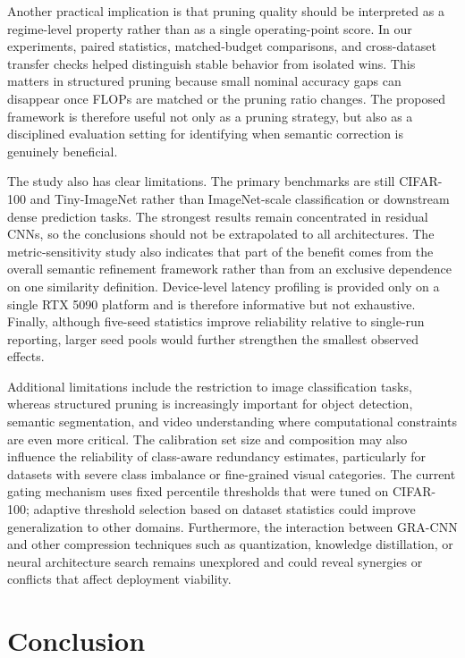 \documentclass[preprint,12pt]{elsarticle}
\begin{document}
Another practical implication is that pruning quality should be interpreted as a regime-level property rather than as a single operating-point score. In our experiments, paired statistics, matched-budget comparisons, and cross-dataset transfer checks helped distinguish stable behavior from isolated wins. This matters in structured pruning because small nominal accuracy gaps can disappear once FLOPs are matched or the pruning ratio changes. The proposed framework is therefore useful not only as a pruning strategy, but also as a disciplined evaluation setting for identifying when semantic correction is genuinely beneficial.

The study also has clear limitations. The primary benchmarks are still CIFAR-100 and Tiny-ImageNet rather than ImageNet-scale classification or downstream dense prediction tasks. The strongest results remain concentrated in residual CNNs, so the conclusions should not be extrapolated to all architectures. The metric-sensitivity study also indicates that part of the benefit comes from the overall semantic refinement framework rather than from an exclusive dependence on one similarity definition. Device-level latency profiling is provided only on a single RTX 5090 platform and is therefore informative but not exhaustive. Finally, although five-seed statistics improve reliability relative to single-run reporting, larger seed pools would further strengthen the smallest observed effects.

Additional limitations include the restriction to image classification tasks, whereas structured pruning is increasingly important for object detection, semantic segmentation, and video understanding where computational constraints are even more critical. The calibration set size and composition may also influence the reliability of class-aware redundancy estimates, particularly for datasets with severe class imbalance or fine-grained visual categories. The current gating mechanism uses fixed percentile thresholds that were tuned on CIFAR-100; adaptive threshold selection based on dataset statistics could improve generalization to other domains. Furthermore, the interaction between GRA-CNN and other compression techniques such as quantization, knowledge distillation, or neural architecture search remains unexplored and could reveal synergies or conflicts that affect deployment viability.

\section{Conclusion}
\label{sec:conclusion}
\end{document}
